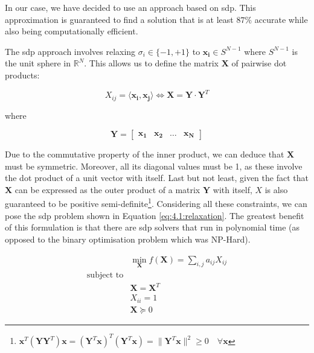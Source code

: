 \documentclass[../main.tex]{subfiles}
\begin{document}
In our case, we have decided to use an approach based on \gls{sdp}. This approximation is guaranteed to find a solution that is at least $87 \si{\percent}$ accurate while also being computationally efficient\cite{kemal2008}.

The \gls{sdp} approach involves relaxing $\sigma_i \in \{-1, +1\}$ to $\bm{x_i} \in S^{N-1}$ where $S^{N-1}$ is the unit sphere in $\mathbb{R}^N$. This allows us to define the matrix $\bm{X}$ of pairwise dot products:

\begin{equation}
    X_{ij} = \langle \bm{x_i}, \bm{x_j} \rangle \Leftrightarrow \bm{X} = \bm{Y} \cdot \bm{Y}^T
\end{equation}

where

\begin{equation}
    \bm{Y} =
    \begin{bmatrix}
        \bm{x_1} & \bm{x_2} & \dots & \bm{x_N}
    \end{bmatrix}
\end{equation}

Due to the commutative property of the inner product, we can deduce that $\bm{X}$ must be symmetric. Moreover, all its diagonal values must be 1, as these involve the dot product of a unit vector with itself. Last but not least, given the fact that $\bm{X}$ can be expressed as the outer product of a matrix $\bm{Y}$ with itself, $X$ is also guaranteed to be positive semi-definite\footnote{$\bm{x}^T (\bm{Y} \bm{Y}^T) \bm{x} = (\bm{Y}^T \bm{x})^T (\bm{Y}^T \bm{x}) = \lVert \bm{Y}^T \bm{x} \rVert^2 \geq 0 \quad \forall \bm{x}$}. Considering all these constraints, we can pose the \gls{sdp} problem shown in Equation \eqref{eq:4.1:relaxation}. The greatest benefit of this formulation is that there are \gls{sdp} solvers that run in polynomial time (as opposed to the binary optimisation problem which was NP-Hard).

\begin{equation}\label{eq:4.1:relaxation}
\begin{aligned}
    & \min_{\bm{X}} f(\bm{X}) = \sum_{i,j} a_{ij}X_{ij}\\
    \text{subject to}\\
    & \bm{X} = \bm{X}^T\\
    & X_{ii} = 1\\
    & \bm{X} \succeq 0
\end{aligned}
\end{equation}
\end{document}
